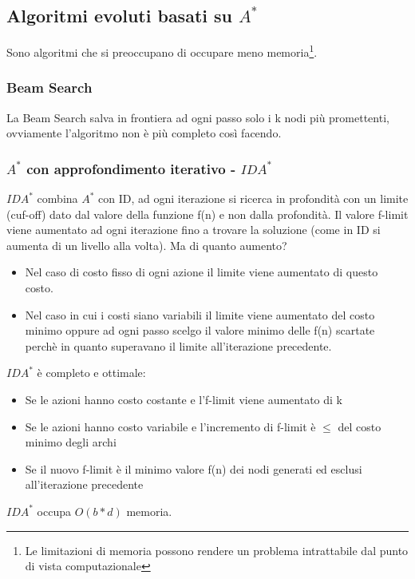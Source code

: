 \documentclass{article}
\begin{document}
\subsection{Algoritmi evoluti basati su $A^*$}
Sono algoritmi che si preoccupano di occupare meno memoria\footnote{Le limitazioni di memoria possono rendere un problema intrattabile dal punto di vista computazionale}.
\subsubsection{Beam Search}
La Beam Search salva in frontiera ad ogni passo solo i k nodi più promettenti, ovviamente l'algoritmo non è più completo così facendo.

\subsubsection{$A^*$ con approfondimento iterativo - $IDA^*$}
$IDA^*$ combina $A^*$ con ID, ad ogni iterazione si ricerca in profondità con un limite (cuf-off) dato dal valore della funzione f(n) e non dalla profondità. Il valore f-limit viene aumentato ad ogni iterazione fino a trovare la soluzione (come in ID si aumenta di un livello alla volta). Ma di quanto aumento? 
\begin{itemize}
    \item Nel caso di costo fisso di ogni azione il limite viene aumentato di questo costo.
    \item Nel caso in cui i costi siano variabili il limite viene aumentato del costo minimo oppure ad ogni passo scelgo il valore minimo delle f(n) scartate perchè in quanto superavano il limite all'iterazione precedente.
\end{itemize}
$IDA^*$ è completo e ottimale:
\begin{itemize}
    \item Se le azioni hanno costo costante e l'f-limit viene aumentato di k
    \item Se le azioni hanno costo variabile e l'incremento di f-limit è $\leq$ del costo minimo degli archi
    \item Se il nuovo f-limit è il minimo valore f(n) dei nodi generati ed esclusi all'iterazione precedente
\end{itemize}
$IDA^*$ occupa $O(b*d)$ memoria.
\end{document}
